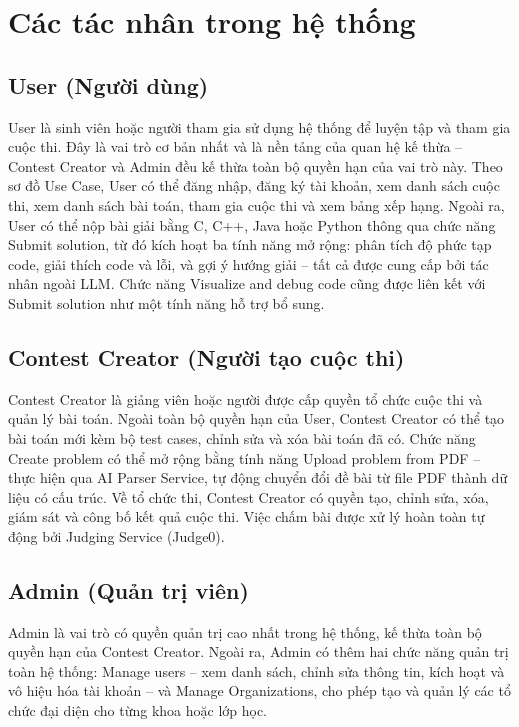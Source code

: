 \documentclass[12pt, a4paper]{report}
\begin{document}
\section{Các tác nhân trong hệ thống}

\subsection{User (Người dùng)}

User là sinh viên hoặc người tham gia sử dụng hệ thống để luyện tập và tham gia cuộc thi. Đây là vai trò cơ bản nhất và là nền tảng của quan hệ kế thừa -- Contest Creator và Admin đều kế thừa toàn bộ quyền hạn của vai trò này. Theo sơ đồ Use Case, User có thể đăng nhập, đăng ký tài khoản, xem danh sách cuộc thi, xem danh sách bài toán, tham gia cuộc thi và xem bảng xếp hạng. Ngoài ra, User có thể nộp bài giải bằng C, C++, Java hoặc Python thông qua chức năng Submit solution, từ đó kích hoạt ba tính năng mở rộng: phân tích độ phức tạp code, giải thích code và lỗi, và gợi ý hướng giải -- tất cả được cung cấp bởi tác nhân ngoài \ac{LLM}. Chức năng Visualize and debug code cũng được liên kết với Submit solution như một tính năng hỗ trợ bổ sung.

\subsection{Contest Creator (Người tạo cuộc thi)}

Contest Creator là giảng viên hoặc người được cấp quyền tổ chức cuộc thi và quản lý bài toán. Ngoài toàn bộ quyền hạn của User, Contest Creator có thể tạo bài toán mới kèm bộ test cases, chỉnh sửa và xóa bài toán đã có. Chức năng Create problem có thể mở rộng bằng tính năng Upload problem from PDF -- thực hiện qua AI Parser Service, tự động chuyển đổi đề bài từ file \ac{PDF} thành dữ liệu có cấu trúc. Về tổ chức thi, Contest Creator có quyền tạo, chỉnh sửa, xóa, giám sát và công bố kết quả cuộc thi. Việc chấm bài được xử lý hoàn toàn tự động bởi Judging Service (Judge0).

\subsection{Admin (Quản trị viên)}

Admin là vai trò có quyền quản trị cao nhất trong hệ thống, kế thừa toàn bộ quyền hạn của Contest Creator. Ngoài ra, Admin có thêm hai chức năng quản trị toàn hệ thống: Manage users -- xem danh sách, chỉnh sửa thông tin, kích hoạt và vô hiệu hóa tài khoản -- và Manage Organizations, cho phép tạo và quản lý các tổ chức đại diện cho từng khoa hoặc lớp học.
\end{document}

